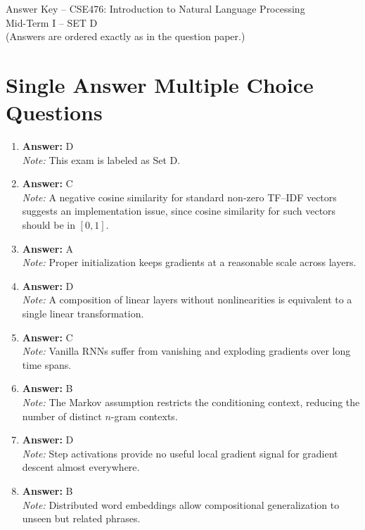 \documentclass[12pt]{article}
\begin{document}
 
 \begin{center}
 Answer Key -- CSE476: Introduction to Natural Language Processing \\
 Mid-Term I -- SET D \\
 \small (Answers are ordered exactly as in the question paper.)
 \end{center}
 
 \section*{Single Answer Multiple Choice Questions}
 
 \begin{enumerate}[label=Q\arabic*.]
 
 \item \textbf{Answer:} D \\
 \textit{Note:} This exam is labeled as Set D.
 
\item \textbf{Answer:} C \\
\textit{Note:} A negative cosine similarity for standard non-zero TF--IDF vectors suggests an implementation issue, since cosine similarity for such vectors should be in $[0,1]$.
 
 \item \textbf{Answer:} A \\
 \textit{Note:} Proper initialization keeps gradients at a reasonable scale across layers.
 
 \item \textbf{Answer:} D \\
 \textit{Note:} A composition of linear layers without nonlinearities is equivalent to a single linear transformation.
 
 \item \textbf{Answer:} C \\
 \textit{Note:} Vanilla RNNs suffer from vanishing and exploding gradients over long time spans.
 
 \item \textbf{Answer:} B \\
 \textit{Note:} The Markov assumption restricts the conditioning context, reducing the number of distinct $n$-gram contexts.
 
 \item \textbf{Answer:} D \\
 \textit{Note:} Step activations provide no useful local gradient signal for gradient descent almost everywhere.
 
 \item \textbf{Answer:} B \\
 \textit{Note:} Distributed word embeddings allow compositional generalization to unseen but related phrases.
 

\end{enumerate}
\end{document}
